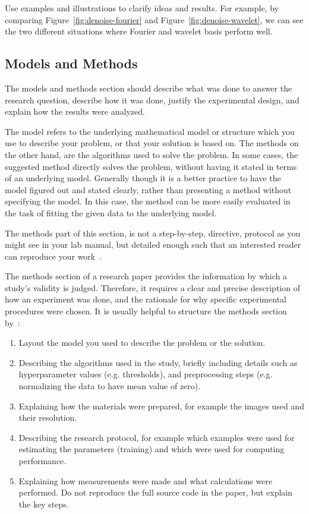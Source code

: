 \documentclass[10pt,conference,compsocconf]{IEEEtran}
\begin{document}
Use examples and illustrations to clarify ideas and results. For
example, by comparing Figure~\ref{fig:denoise-fourier} and
Figure~\ref{fig:denoise-wavelet}, we can see the two different
situations where Fourier and wavelet basis perform well. 

\subsection{Models and Methods}
The models and methods
section should describe what was
done to answer the research question, describe how it was done,
justify the experimental design, and
explain how the results were analyzed.

The model refers to the underlying mathematical model or structure which 
you use to describe your problem, or that your solution is based on. 
The methods on the other hand, are the algorithms used to solve the problem. 
In some cases, the suggested method directly solves the problem, without having it 
stated in terms of an underlying model. Generally though it is a better practice to have 
the model figured out and stated clearly, rather than presenting a method without specifying 
the model. In this case, the method can be more easily evaluated in the task of fitting 
the given data to the underlying model.

The methods part of this section, is not a step-by-step, directive,
protocol as you might see in your lab manual, but detailed enough such
that an interested reader can reproduce your
work~\cite{anderson04,wavelab}.

The methods section of a research paper provides the information by
which a study's validity is judged.
Therefore, it requires a clear and precise description of how an
experiment was done, and the rationale
for why specific experimental procedures were chosen.
It is usually helpful to
structure the methods section by~\cite{kallet04methods}:
\begin{enumerate}
\item Layout the model you used to describe the problem or the solution.
\item Describing the algorithms used in the study, briefly including
  details such as hyperparameter values (e.g. thresholds), and
  preprocessing steps (e.g. normalizing the data to have mean value of
  zero).
\item Explaining how the materials were prepared, for example the
  images used and their resolution.
\item Describing the research protocol, for example which examples
  were used for estimating the parameters (training) and which were
  used for computing performance.
\item Explaining how measurements were made and what
  calculations were performed. Do not reproduce the full source code in
  the paper, but explain the key steps.
\end{enumerate}
\end{document}
